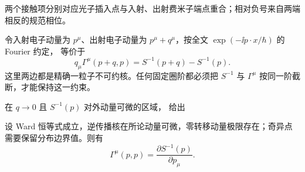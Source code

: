 两个接触项分别对应光子插入点与入射、出射费米子端点重合；相对负号来自两端相反的规范相位。

令入射电子动量为 $p^\mu$、出射电子动量为 $p^\mu+q^\mu$，按全文 $\exp(-\ii p\cdot x/\hbar)$ 的 Fourier 约定， 等价于
\begin{equation}
{
q_\mu\Gamma^\mu(p+q,p)
=S^{-1}(p+q)-S^{-1}(p).}
\label{eq:qed_ward_takahashi_momentum}
\end{equation}
这里两边都是精确一粒子不可约核。任何固定圈阶都必须把 $S^{-1}$ 与 $\Gamma^\mu$ 按同一阶截断，才能保持这一约束。

在 $q\to0$ 且 $S^{-1}(p)$ 对外动量可微的区域， 给出


\begin{proposition}[零动量顶角与逆传播核导数]
设 Ward 恒等式成立，逆传播核在所论动量可微，零转移动量极限存在；奇异点需要保留分布边界值。则有
\begin{equation}
{
\Gamma^\mu(p,p)
=\frac{\partial S^{-1}(p)}{\partial p_\mu}.}
\label{eq:qed_ward_zero_momentum_vertex_derivative}
\end{equation}
\end{proposition}
